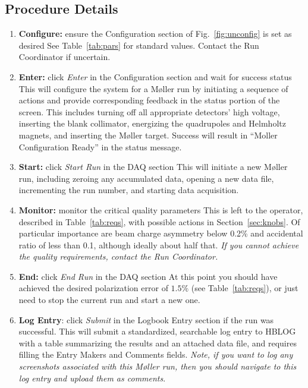 \documentclass[amsmath,amssymb,notitlepage,12pt]{revtex4}
\begin{document}
\subsection{Procedure Details}
\begin{enumerate}
    \item {\bf Configure:}  ensure the Configuration section of Fig.~\ref{fig:unconfig} is set as desired
        \subitem
        See Table~\ref{tab:pars} for standard values.  Contact the Run Coordinator if uncertain.
\item {\bf Enter:} click {\em Enter} in the Configuration section and wait for success status
    \subitem This will configure the system for a M{\o}ller run by initiating a sequence of actions and provide corresponding feedback in the status portion of the screen.  This includes turning off all appropriate detectors' high voltage, inserting the blank collimator, energizing the quadrupoles and Helmholtz magnets, and inserting the M{\o}ller target.  Success will result in ``Moller Configuration Ready'' in the status message.
\item {\bf Start:} click {\em Start Run} in the DAQ section
    \subitem This will initiate a new M{\o}ller run, including zeroing any accumulated data, opening a new data file, incrementing the run number, and starting data acquisition.
\item {\bf Monitor:} monitor the critical quality parameters
    \subitem This is left to the operator, described in Table~\ref{tab:reqs}, with possible actions in Section~\ref{sec:knobs}.  Of particular importance are beam charge asymmetry below 0.2\% and accidental ratio of less than 0.1, although ideally about half that.  {\em If you cannot achieve the quality requirements, contact the Run Coordinator.}
\item {\bf End:} click {\em End Run} in the DAQ section
    \subitem At this point you should have achieved the desired polarization error of $1.5\%$ (see Table~\ref{tab:reqs}), or just need to stop the current run and start a new one.
\item {\bf Log Entry}: click {\em Submit} in the Logbook Entry section if the run was successful. 
    \subitem This will submit a standardized, searchable log entry to HBLOG with a table summarizing the results and an attached data file, and requires filling the Entry Makers and Comments fields.  {\em Note, if you want to log any screenshots associated with this M{\o}ller run, then you should navigate to this log entry and upload them as comments}.

\end{enumerate}
\end{document}
